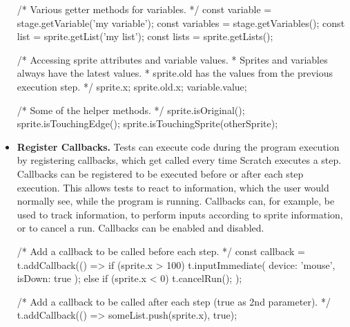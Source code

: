 \begin{itemize}
\begin{javascriptcode}
            /* Various getter methods for variables. */
            const variable = stage.getVariable('my variable');
            const variables = stage.getVariables();
            const list = sprite.getList('my list');
            const lists = sprite.getLists();

            /* Accessing sprite attributes and variable values.
             * Sprites and variables always have the latest values.
             * sprite.old has the values from the previous execution step. */
            sprite.x;
            sprite.old.x;
            variable.value;

            /* Some of the helper methods. */
            sprite.isOriginal();
            sprite.isTouchingEdge();
            sprite.isTouchingSprite(otherSprite);
        \end{javascriptcode}
    \item \textbf{Register Callbacks.}
        Tests can execute code during the program execution by registering callbacks, which get called every time Scratch executes a step.
        Callbacks can be registered to be executed before or after each step execution.
        This allows tests to react to information, which the user would normally see, while the program is running.
        Callbacks can, for example, be used to track information, to perform inputs according to sprite information, or to cancel a run.
        Callbacks can be enabled and disabled.
        \begin{javascriptcode}
            /* Add a callback to be called before each step. */
            const callback = t.addCallback(() => {
                if (sprite.x > 100) {
                    t.inputImmediate({ device: 'mouse', isDown: true });
                } else if (sprite.x < 0) {
                    t.cancelRun();
                }
            });

            /* Add a callback to be called after each step (true as 2nd parameter). */
            t.addCallback(() => someList.push(sprite.x), true);


\end{javascriptcode}
\end{itemize}

